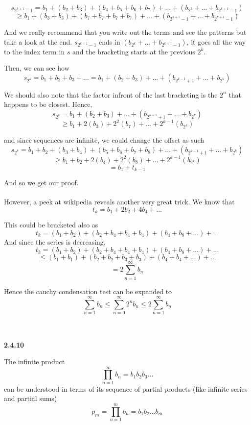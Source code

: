 $$
s_{2^{k+1}-1} =
b_1 + (b_2 + b_3) + (b_4 + b_5 + b_6 + b_7) + \ldots + (b_{2^k} + \ldots + b_{2^{k+1}-1})
$$
$$
\geq b_1 + (b_3 + b_3) + (b_7 + b_7 + b_7 + b_7) + \ldots + (b_{2^{k+1}-1} + \ldots + b_{2^{k+1}-1})
$$

And we really recommend that you write out the terms and see the patterns but take a look at the end.
$s_{2^{k+1}-1}$ ends in $(b_{2^k} + \ldots + b_{2^{k+1}-1})$, it goes all the way to the index term in $s$
and the bracketing starts at the previous $2^{k}$.

Then, we can see how
$$
s_{2^k} = b_1 + b_2 + b_3 + \ldots
= b_1 + (b_2 + b_3) + \ldots + (b_{2^{k-1}+1} + \ldots + b_{2^k})
$$

We should also note that the factor infront of the last bracketing is the $2^n$ that happens to be closest.
Hence,
$$
s_{2^k}
= b_1 + (b_2 + b_3) + \ldots + (b_{2^{k-1}+1} + \ldots + b_{2^k})
$$
$$
\geq b_1 + 2 (b_3) + 2^2 (b_7) + \ldots + 2^{k-1} (b_{2^{k}})
$$

and since sequences are infinite, we could change the offset as such
$$
s_{2^k}
= b_1 + b_2 + (b_3 + b_4) + (b_5 + b_6 + b_7 + b_8) + \ldots + (b_{2^{k-1}+1} + \ldots + b_{2^k})
$$
$$
\geq b_1 + b_2 + 2 (b_4) + 2^2 (b_8) + \ldots + 2^{k-1} (b_{2^{k}})
$$
$$
= b_1 + t_{k-1}
$$

And so we get our proof.
\\~\\

However, a peek at wikipedia reveals another very great trick.
We know that
$$
t_k = b_1 + 2b_2 + 4b_4 + \ldots
$$

This could be bracketed also as
$$
t_k = (b_1 + b_2) + (b_2 + b_4 + b_4 + b_4) + (b_4 + b_8 + \ldots) + \ldots
$$
And since the series is decreasing,
$$
t_k = (b_1 + b_2) + (b_2 + b_4 + b_4 + b_4) + (b_4 + b_8 + \ldots) + \ldots
$$
$$
\leq (b_1 + b_1) + (b_2 + b_2 + b_3 + b_3) + (b_4 + b_4 + \ldots) + \ldots
$$
$$
= 2\sum^{\infty}_{n=1} b_n
$$

Hence the cauchy condensation test can be expanded to
$$
\sum^{\infty}_{n=1} b_n \leq \sum^{\infty}_{n=0} 2^n b_n \leq 2\sum^{\infty}_{n=1} b_n
$$
\\~\\



\label{abbott:2.4.10}

\textbf{2.4.10}

The infinite product
$$
\prod^{\infty}_{n=1} b_n = b_1 b_2 b_3 \ldots
$$
can be understood in terms of its sequence of partial products (like infinite series and partial sums)
$$
p_m = \prod^{m}_{n=1} b_n = b_1 b_2 \ldots b_m
$$

